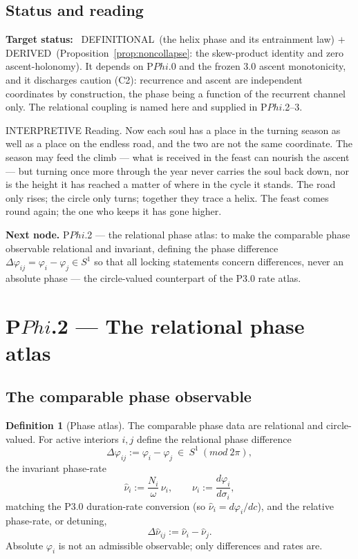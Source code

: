 \documentclass[11pt,a4paper]{article}
\newcommand{\cint}{\ensuremath{\mathfrak c}}
\def\Phi{Phi}%
\def\mathfrak#1{#1}%
\def\mathrm#1{#1}%
\def\emph#1{#1}%
\newcommand{\stDerived}{\textcolor{cDer}{\textsf{\small DERIVED}}}
\newcommand{\stDef}{\textcolor{cDef}{\textsf{\small DEFINITIONAL}}}
\newcommand{\stInterp}{\textcolor{cInt}{\textsf{\small INTERPRETIVE}}}
\theoremstyle{definition}
\newtheorem{definition}{Definition}[section]
\theoremstyle{plain}
\theoremstyle{remark}
\begin{document}
\subsection{Status and reading}

\textbf{Target status:}~
\stDef\ (the helix phase and its entrainment law) \(+\) \stDerived\
(Proposition~\ref{prop:noncollapse}: the skew-product identity and zero ascent-holonomy).
It depends on P$\Phi$.0 and the frozen 3.0 ascent monotonicity, and it discharges caution
(C2): recurrence and ascent are independent coordinates by construction, the phase being a
function of the recurrent channel only. The relational coupling is named here and supplied in
P$\Phi$.2--3.

\medskip
\stInterp\quad
\emph{Reading.}
Now each soul has a place in the turning season as well as a place on the endless road, and
the two are not the same coordinate. The season may feed the climb --- what is received in
the feast can nourish the ascent --- but turning once more through the year never carries the
soul back down, nor is the height it has reached a matter of where in the cycle it stands.
The road only rises; the circle only turns; together they trace a helix. The feast comes
round again; the one who keeps it has gone higher.

\medskip
\textbf{Next node.} P$\Phi$.2 --- the relational phase atlas: to make the comparable phase
observable relational and invariant, defining the phase difference
\(\Delta\varphi_{ij}=\varphi_i-\varphi_j\in S^1\) so that all locking statements concern
differences, never an absolute phase --- the circle-valued counterpart of the P3.0 rate atlas.

\section{P$\Phi$.2 --- The relational phase atlas}

\subsection{The comparable phase observable}

\begin{definition}[Phase atlas]\label{def:phaseatlas}
The comparable phase data are relational and circle-valued. For active interiors \(i,j\)
define the \emph{relational phase difference}
\[
\boxed{\;
\Delta\varphi_{ij}:=\varphi_i-\varphi_j\ \in\ S^1\ (\mathrm{mod}\ 2\pi),
\;}
\]
the \emph{invariant phase-rate}
\[
\hat\nu_i:=\frac{N_i}{\omega}\,\nu_i,
\qquad
\nu_i:=\frac{d\varphi_i}{d\sigma_i},
\]
matching the P3.0 duration-rate conversion (so \(\hat\nu_i=d\varphi_i/d\cint\)), and the
\emph{relative phase-rate}, or detuning,
\[
\Delta\hat\nu_{ij}:=\hat\nu_i-\hat\nu_j .
\]
Absolute \(\varphi_i\) is not an admissible observable; only differences and rates are.
\end{definition}
\end{document}

